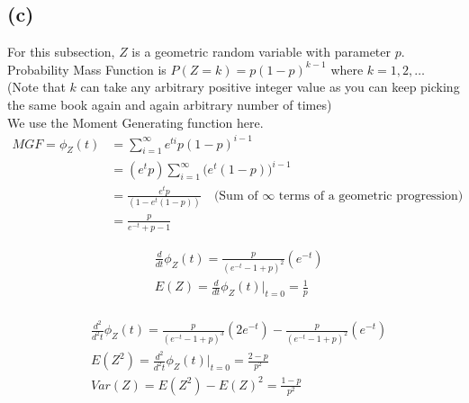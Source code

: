 \documentclass[11pt, fleqn]{article}
\begin{document}
\subsection*{(c)}
For this subsection, $Z$ is a geometric random variable with parameter $p$. \\
Probability Mass Function is $P(Z = k) = p (1-p)^{k-1}$ where $k = 1, 2, \ldots$\\
(Note that $k$ can take any arbitrary positive integer value as you can keep picking the same book again and again arbitrary number of times)\\
We use the Moment Generating function here.
\begin{equation}
    \begin{split}
        MGF = \phi_Z(t) &= \sum_{i=1}^{\infty} e^{ti} p(1-p)^{i-1} \\
            &= (e^{t} p) \sum_{i=1}^{\infty} \bigg(e^t (1-p)\bigg)^{i-1} \\
            &= \frac{e^{t} p}{(1 - e^t(1-p))} \hspace{1em} \text{(Sum of $\infty$ terms of a geometric progression)}\\
            &= \frac{p}{e^{-t} + p - 1}
    \end{split}
\end{equation}

\begin{equation}
    \begin{split}
        & \frac{d}{dt} \phi_Z(t) = \frac{p}{(e^{-t} - 1 + p)^2} (e^{-t}) \\
        & \boxed{E(Z) = \frac{d}{dt} \phi_Z(t) \bigg\rvert_{t = 0} = \frac{1}{p}} \\
    \end{split}
\end{equation}

\begin{equation}
    \begin{split}
        & \frac{d^2}{d^2t} \phi_Z(t) = \frac{p}{(e^{-t} - 1 + p)^3} (2e^{-t}) - \frac{p}{(e^{-t} - 1 + p)^2} (e^{-t}) \\
        & E(Z^2) = \frac{d^2}{d^2t} \phi_Z(t) \bigg\rvert_{t = 0} = \frac{2 - p}{p^2} \\
        & \boxed{Var(Z) = E(Z^2) - E(Z)^2 = \frac{1 - p}{p^2}} \\
    \end{split}
\end{equation}
\end{document}
